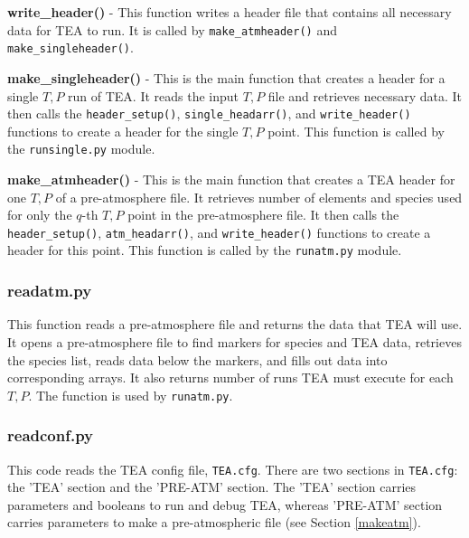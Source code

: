 {\bf write\_header()} - This function writes a header file that
contains all necessary data for TEA to run. It is called
by \texttt{make\_atmheader()} and \texttt{make\_singleheader()}.

{\bf make\_singleheader()} - This is the main function that creates a
header for a single $T, P$ run of TEA. It reads the input $T, P$ file
and retrieves necessary data. It then calls
the \texttt{header\_setup()}, \newline \texttt{single\_headarr()},
and \texttt{write\_header()} functions to create a header for the
single $T, P$ point. This function is called by
the \texttt{runsingle.py} module.

{\bf make\_atmheader()} - This is the main function that creates a TEA
header for one $T, P$ of a pre-atmosphere file. It retrieves number of
elements and species used for only the $q$-th $T, P$ point in the
pre-atmosphere file. It then calls
the \texttt{header\_setup()}, \texttt{atm\_headarr()},
and \texttt{write\_header()} functions to create a header for this
point. This function is called by the \texttt{runatm.py} module.
    



\subsubsection{readatm.py}

This function reads a pre-atmosphere file and returns the data that
TEA will use.  It opens a pre-atmosphere file to find markers for
species and TEA data, retrieves the species list, reads data below the
markers, and fills out data into corresponding arrays. It also returns
number of runs TEA must execute for each $T, P$. The function is used
by \texttt{runatm.py}.


\subsubsection{readconf.py}

This code reads the TEA config file, \texttt{TEA.cfg}. There are two
sections in \texttt{TEA.cfg}: the 'TEA' section and the 'PRE-ATM'
section. The 'TEA' section carries parameters and booleans to run and
debug TEA, whereas 'PRE-ATM' section carries parameters to make a
pre-atmospheric file (see Section \ref{makeatm}).





